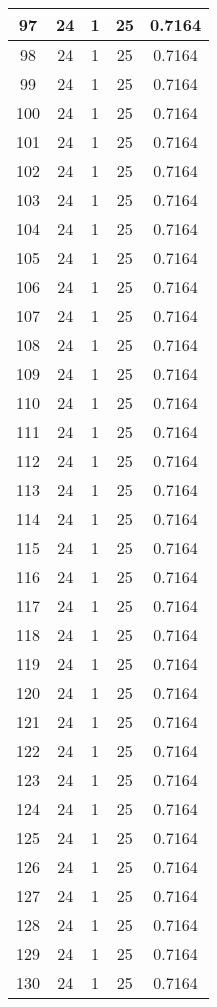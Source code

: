 \documentclass[letterpaper, 12pt]{article}
\begin{document}
\begin{longtable}{|c|c|c|c|c|}
\hline
97 & 24 & 1 & 25 & 0.7164 \\
\hline
98 & 24 & 1 & 25 & 0.7164 \\
\hline
99 & 24 & 1 & 25 & 0.7164 \\
\hline
100 & 24 & 1 & 25 & 0.7164 \\
\hline
101 & 24 & 1 & 25 & 0.7164 \\
\hline
102 & 24 & 1 & 25 & 0.7164 \\
\hline
103 & 24 & 1 & 25 & 0.7164 \\
\hline
104 & 24 & 1 & 25 & 0.7164 \\
\hline
105 & 24 & 1 & 25 & 0.7164 \\
\hline
106 & 24 & 1 & 25 & 0.7164 \\
\hline
107 & 24 & 1 & 25 & 0.7164 \\
\hline
108 & 24 & 1 & 25 & 0.7164 \\
\hline
109 & 24 & 1 & 25 & 0.7164 \\
\hline
110 & 24 & 1 & 25 & 0.7164 \\
\hline
111 & 24 & 1 & 25 & 0.7164 \\
\hline
112 & 24 & 1 & 25 & 0.7164 \\
\hline
113 & 24 & 1 & 25 & 0.7164 \\
\hline
114 & 24 & 1 & 25 & 0.7164 \\
\hline
115 & 24 & 1 & 25 & 0.7164 \\
\hline
116 & 24 & 1 & 25 & 0.7164 \\
\hline
117 & 24 & 1 & 25 & 0.7164 \\
\hline
118 & 24 & 1 & 25 & 0.7164 \\
\hline
119 & 24 & 1 & 25 & 0.7164 \\
\hline
120 & 24 & 1 & 25 & 0.7164 \\
\hline
121 & 24 & 1 & 25 & 0.7164 \\
\hline
122 & 24 & 1 & 25 & 0.7164 \\
\hline
123 & 24 & 1 & 25 & 0.7164 \\
\hline
124 & 24 & 1 & 25 & 0.7164 \\
\hline
125 & 24 & 1 & 25 & 0.7164 \\
\hline
126 & 24 & 1 & 25 & 0.7164 \\
\hline
127 & 24 & 1 & 25 & 0.7164 \\
\hline
128 & 24 & 1 & 25 & 0.7164 \\
\hline
129 & 24 & 1 & 25 & 0.7164 \\
\hline
130 & 24 & 1 & 25 & 0.7164 \\

\end{longtable}
\end{document}
